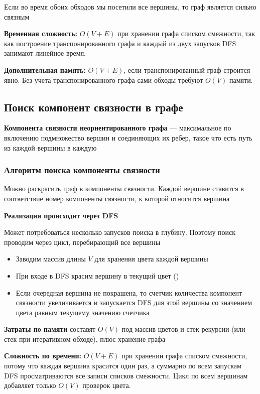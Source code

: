 \documentclass[a4paper]{article}
\begin{document}
Если во время обоих обходов мы посетили все вершины, то граф является сильно связным

\textbf{Временная сложность:} $O(V+E)$ при хранении графа списком смежности, так как построение транспонированного графа и каждый из двух запусков DFS занимают линейное время.

\textbf{Дополнительная память:} $O(V+E)$, если транспонированный граф строится явно. Без учета транспонированного графа сами обходы требуют $O(V)$ памяти.

\subsection{Поиск компонент связности в графе}
\textbf{Компонента связности неориентированного графа} — максимальное по включению подмножество вершин и соединяющих их ребер, такое что есть путь из каждой вершины в каждую

\subsubsection*{Алгоритм поиска компоненты связности}
Можно раскрасить граф в компоненты связности. Каждой вершине ставится в соответствие номер компоненты связности, к которой относится вершина

\textbf{Реализация происходит через DFS}

Может потребоваться несколько запусков поиска в глубину. Поэтому поиск проводим через цикл, перебирающий все вершины

\begin{itemize}
    \item Заводим массив длины $V$ для хранения цвета каждой вершины
    \item При входе в DFS красим вершину в текущий цвет ()
    \item Если очередная вершина не покрашена, то счетчик количества компонент связности увеличивается и запускается DFS для этой вершины со значением цвета равным текущему значению счетчика
\end{itemize}

\textbf{Затраты по памяти} составят $O(V)$ под массив цветов и стек рекурсии (или стек при итеративном обходе), плюс хранение графа

\textbf{Сложность по времени:} $O(V + E)$ при хранении графа списком смежности, потому что каждая вершина красится один раз, а суммарно по всем запускам DFS просматриваются все записи списков смежности. Цикл по всем вершинам добавляет только $O(V)$ проверок цвета.
\end{document}
